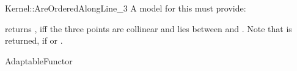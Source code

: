 \begin{ccRefFunctionObjectConcept}{Kernel::AreOrderedAlongLine_3}
A model for this must provide:


         {returns , iff the three points are collinear and 
           lies between  and .
          Note that  is returned, if  or
          .}

\ccRefines
AdaptableFunctor

\ccSeeAlso
{}  \\


\end{ccRefFunctionObjectConcept}
